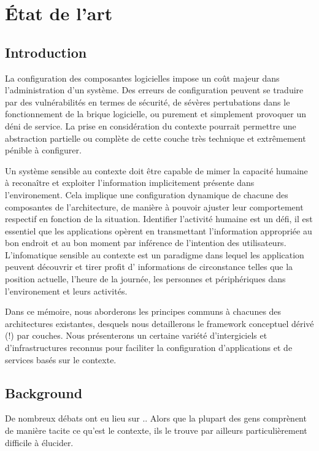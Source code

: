 \chapter{État de l'art}

\section{Introduction}

La configuration des composantes logicielles impose un coût majeur dans
l'administration d'un système. Des erreurs de configuration peuvent se traduire
par des vulnérabilités en termes de sécurité, de sévères pertubations dans le
fonctionnement de la brique logicielle, ou purement et simplement provoquer un
déni de service. La prise en considération du contexte pourrait permettre une
abstraction partielle ou complète de cette couche très technique et extrêmement
pénible à configurer.

Un système sensible au contexte doit être capable de mimer la capacité humaine à
reconaître et exploiter l'information implicitement présente dans
l'environement. Cela implique une configuration dynamique de chacune des
composantes de l'architecture, de manière à pouvoir ajuster leur comportement
respectif en fonction de la situation. Identifier l'activité humaine est un
défi, il est essentiel que les applications opèrent en transmettant
l'information appropriée au bon endroit et au bon moment par inférence de
l'intention des utilisateurs. L'infomatique sensible au contexte est un
paradigme dans lequel les application peuvent découvrir et tirer profit d'
informations de circonstance telles que la position actuelle, l'heure de la
journée, les personnes et périphériques dans l'environement et leurs activités.

Dans ce mémoire, nous aborderons les principes communs à chacunes des
architectures existantes, desquels nous detaillerons le framework conceptuel
dérivé (!) par couches. Nous présenterons un certaine variété d'intergiciels et
d'infrastructures reconnus pour faciliter la configuration d'applications et de
services basés sur le contexte.

\section{Background}

De nombreux débats ont eu lieu sur .. Alors que la plupart des gens comprènent
de manière tacite ce qu'est le contexte, ils le trouve par ailleurs
particulièrement difficile à élucider.

